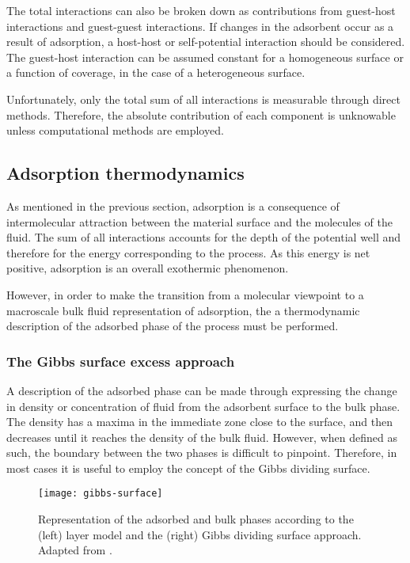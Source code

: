 The total interactions can also be broken down as contributions
from guest-host interactions and guest-guest interactions.
If changes in the adsorbent occur as a result of adsorption,
a host-host or self-potential interaction should be considered.
The guest-host interaction can be assumed constant for a homogeneous
surface or a function of coverage, in the case of a 
heterogeneous surface.

Unfortunately, only the total sum of all interactions
is measurable through direct methods. Therefore, the 
absolute contribution of each component is unknowable unless
computational methods are employed.

\subsection{Adsorption thermodynamics}

As mentioned in the previous section, adsorption 
is a consequence of intermolecular attraction between the 
material surface and the molecules of the fluid. The sum of 
all interactions accounts for the depth of the potential 
well and therefore for the energy corresponding to the 
process. As this energy is net positive, adsorption is an
overall exothermic phenomenon.

However, in order to make the transition from a molecular 
viewpoint to a macroscale bulk fluid representation of 
adsorption, the a thermodynamic description of the adsorbed 
phase of the process must be performed.

\subsubsection{The Gibbs surface excess approach}

A description of the adsorbed phase can be made through 
expressing the change in density or concentration of fluid
from the adsorbent surface to the bulk phase. The density 
has a maxima in the immediate zone close to the surface, and then
decreases until it reaches the density of the bulk fluid.
However, when defined as such, the boundary between the 
two phases is difficult to pinpoint.
Therefore, in most cases it is useful to employ the concept 
of the Gibbs dividing surface.

\begin{figure}[htb]
  \centering

  \texttt{[image: gibbs-surface]}
  \caption{
    Representation of the adsorbed and bulk phases according to
    the (left) layer model and the (right) Gibbs dividing surface
    approach. Adapted from \citeauthor{rouquerolAdsorptionPowdersPorous2013}%
    \cite{rouquerolAdsorptionPowdersPorous2013}.
  }%
  \label{calo:fig:gibbs-surface}

\end{figure}

